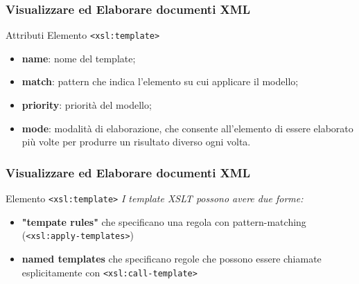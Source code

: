 \begin{frame}
    \frametitle{Visualizzare ed Elaborare documenti XML}
    \addtocounter{nframe}{1}
    

     \begin{block}{Attributi Elemento \texttt{<xsl:template>}}
         \begin{itemize}
             \item \textbf{name}: nome del template;
             \item \textbf{match}: pattern che indica l'elemento su cui applicare il modello;
             \item \textbf{priority}: priorità del modello;
             \item \textbf{mode}: modalità di elaborazione, che consente all'elemento di essere elaborato più volte per produrre un risultato diverso ogni volta.
        \end{itemize}
     \end{block}
    
\end{frame}


\begin{frame}
    \frametitle{Visualizzare ed Elaborare documenti XML}
    \addtocounter{nframe}{1}
    

     \begin{block}{Elemento \texttt{<xsl:template>}}
        \textit{I template XSLT possono avere due forme: }
        \begin{itemize}
            \item \textbf{"tempate rules"} che specificano una regola con pattern-matching (\texttt{<xsl:apply-templates>})
            \item \textbf{named templates} che specificano regole che possono essere chiamate esplicitamente con \texttt{<xsl:call-template>}
        \end{itemize}

     \end{block}
    
\end{frame}


